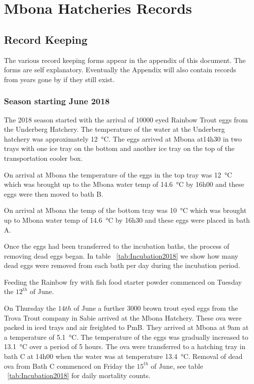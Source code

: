 \chapter{Mbona Hatcheries Records}


\section{Record Keeping}

The various record keeping forms appear in the appendix of this document. The forms are self explanatory.
Eventually the Appendix will also contain records from years gone by if they still exist. 

\subsection{Season starting June 2018}

The 2018 season started with the arrival of $10000$ eyed Rainbow Trout eggs from the Underberg Hatchery. 
The temperature of the water at the Underberg hatchery was approximately \SI{12}{\celsius}.
The eggs arrived at Mbona at14h30 in two trays with one ice tray on the bottom and 
another ice tray on the top of the transportation cooler box.

On arrival at Mbona the temperature of the eggs in the top tray was \SI{12}{\celsius} which was brought up to
the Mbona water temp of \SI{14.6}{\celsius} by 16h00 and these eggs were then moved to bath B.

On arrival at Mbona the temp of the bottom tray was \SI{10}{\celsius} 
which was brought up to Mbona water temp of \SI{14.6}{\celsius} by 16h30 and these eggs were placed
in bath A.

Once the eggs had been transferred to the incubation baths, the process of removing dead eggs began.
In table ~\ref{tab:Incubation2018} we show how many dead eggs were removed from each bath per day
during the incubation period.

Feeding the Rainbow fry with fish food starter powder commenced on Tuesday the $12^{th}$ of June.

On Thursday the $14{th}$ of June a further $3000$ brown trout eyed eggs from the Trova Trout company 
in Sabie arrived at the Mbona Hatchery. These ova were packed in iced trays and air freighted to PmB. 
They arrived at Mbona at 9am at a temperature of \SI{5.1}{\celsius}. 
The temperature of the eggs was gradually increased to \SI{13.1}{\celsius} over a period of 5 hours. 
The ova were transferred to a hatching tray in bath C at 14h00 when the water was at 
temperature \SI{13.4}{\celsius}. 
Removal of dead ova from Bath C commenced on Friday the $15^{th}$ of June, 
see table ~\ref{tab:Incubation2018} for daily mortality counts.

